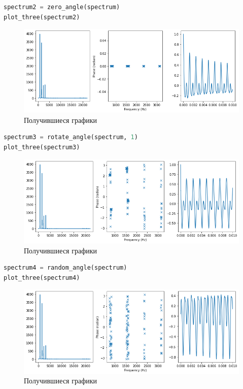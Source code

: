 \begin{lstlisting}[language=Python]
spectrum2 = zero_angle(spectrum)
plot_three(spectrum2)
\end{lstlisting}
\begin{figure}[H]
	\begin{center}
		\includegraphics[scale=0.66]{fig/lab06/lab06_59_1.png}
		\caption{Получившиеся графики}
	\end{center}
\end{figure}


\begin{lstlisting}[language=Python]
spectrum3 = rotate_angle(spectrum, 1)
plot_three(spectrum3)
\end{lstlisting}
\begin{figure}[H]
	\begin{center}
		\includegraphics[scale=0.66]{fig/lab06/lab06_61_1.png}
		\caption{Получившиеся графики}
	\end{center}
\end{figure}


\begin{lstlisting}[language=Python]
spectrum4 = random_angle(spectrum)
plot_three(spectrum4)
\end{lstlisting}
\begin{figure}[H]
	\begin{center}
		\includegraphics[scale=0.66]{fig/lab06/lab06_63_1.png}
		\caption{Получившиеся графики}
	\end{center}
\end{figure}


